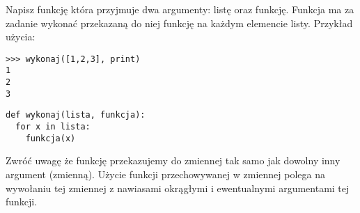 \dbEntryCheckResults
Napisz funkcję która przyjmuje dwa argumenty: listę oraz funkcję. Funkcja ma za zadanie wykonać przekazaną do niej funkcję na każdym elemencie listy. Przykład użycia:
\begin{Verbatim}
>>> wykonaj([1,2,3], print)
1
2
3
\end{Verbatim}
\fi

\dbEntryCheckResults
\begin{verbatim}
def wykonaj(lista, funkcja):
  for x in lista:
    funkcja(x)
\end{verbatim}

\noindent Zwróć uwagę że funkcję przekazujemy do zmiennej tak samo jak dowolny inny argument (zmienną).
Użycie funkcji przechowywanej w zmiennej polega na wywołaniu tej zmiennej z nawiasami okrągłymi i ewentualnymi argumentami tej funkcji.
\fi
